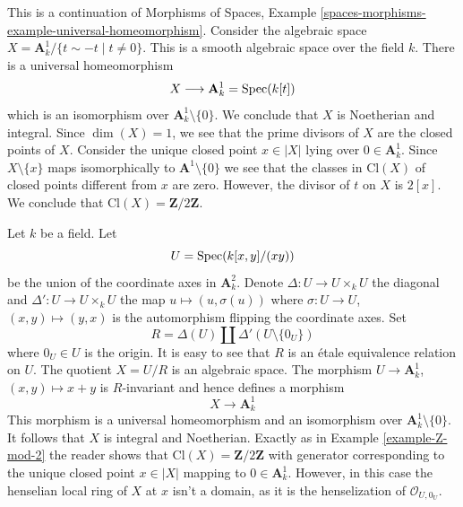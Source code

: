 \begin{example}
\label{example-Z-mod-2}
This is a continuation of Morphisms of Spaces, Example
\ref{spaces-morphisms-example-universal-homeomorphism}.
Consider the algebraic space
$X = \mathbf{A}^1_k/\{t \sim -t \mid t \not = 0\}$.
This is a smooth algebraic space over the field $k$.
There is a universal homeomorphism
$$
X \longrightarrow \mathbf{A}^1_k = \mathop{\mathrm{Spec}}(k[t])
$$
which is an isomorphism over $\mathbf{A}^1_k \setminus \{0\}$.
We conclude that $X$ is Noetherian and integral.
Since $\dim(X) = 1$, we see that the prime divisors of $X$ are
the closed points of $X$.
Consider the unique closed point $x \in |X|$ lying over $0 \in \mathbf{A}^1_k$.
Since $X \setminus \{x\}$ maps isomorphically to $\mathbf{A}^1 \setminus \{0\}$
we see that the classes in $\text{Cl}(X)$ of closed points different
from $x$ are zero. However, the divisor of $t$ on $X$ is $2[x]$.
We conclude that $\text{Cl}(X) = \mathbf{Z}/2\mathbf{Z}$.
\end{example}

\begin{example}
\label{example-not-a-domain}
Let $k$ be a field. Let
$$
U = \mathop{\mathrm{Spec}}(k[x, y]/(xy))
$$
be the union of the coordinate axes in $\mathbf{A}^2_k$.
Denote $\Delta : U \to U \times_k U$ the diagonal and
$\Delta' : U \to U \times_k U$ the map $u \mapsto (u, \sigma(u))$
where $\sigma : U \to U$, $(x, y) \mapsto (y, x)$
is the automorphism flipping the coordinate axes. Set
$$
R = \Delta(U) \amalg \Delta'(U \setminus \{0_U\})
$$
where $0_U \in U$ is the origin. It is easy to see that
$R$ is an \'etale equivalence relation on $U$. The quotient $X = U/R$
is an algebraic space. The morphism $U \to \mathbf{A}^1_k$,
$(x, y) \mapsto x + y$ is $R$-invariant and hence defines
a morphism
$$
X \longrightarrow \mathbf{A}^1_k
$$
This morphism is a universal homeomorphism and an isomorphism over
$\mathbf{A}^1_k \setminus \{0\}$. It follows that $X$ is integral
and Noetherian. Exactly as in Example \ref{example-Z-mod-2}
the reader shows that $\text{Cl}(X) = \mathbf{Z}/2\mathbf{Z}$
with generator corresponding to the unique closed point $x \in |X|$
mapping to $0 \in \mathbf{A}^1_k$. However, in this case the henselian
local ring of $X$ at $x$ isn't a domain, as it is the henselization
of $\mathcal{O}_{U, 0_U}$.
\end{example}














